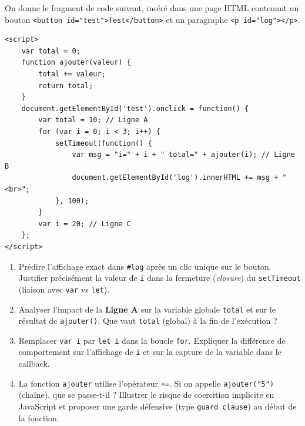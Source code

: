 \documentclass[11pt]{article}
\begin{document}
\begin{exercice}
On donne le fragment de code suivant, inséré dans une page HTML contenant un bouton \texttt{<button id="test">Test</button>} et un paragraphe \texttt{<p id="log"></p>}.

\begin{verbatim}
<script>
    var total = 0;
    function ajouter(valeur) {
        total += valeur;
        return total;
    }
    document.getElementById('test').onclick = function() {
        var total = 10; // Ligne A
        for (var i = 0; i < 3; i++) {
            setTimeout(function() {
                var msg = "i=" + i + " total=" + ajouter(i); // Ligne B
                document.getElementById('log').innerHTML += msg + "<br>";
            }, 100);
        }
        var i = 20; // Ligne C
    };
</script>
\end{verbatim}

\begin{enumerate}
    \item Prédire l'affichage exact dans \texttt{\#log} après un clic unique sur le bouton. Justifier précisément la valeur de \texttt{i} dans la fermeture (\textit{closure}) du \texttt{setTimeout} (liaison avec \texttt{var} vs \texttt{let}).
    \item Analyser l'impact de la \textbf{Ligne A} sur la variable globale \texttt{total} et sur le résultat de \texttt{ajouter()}. Que vaut \texttt{total} (global) à la fin de l'exécution ?
    \item Remplacer \texttt{var i} par \texttt{let i} dans la boucle \texttt{for}. Expliquer la différence de comportement sur l'affichage de \texttt{i} et sur la capture de la variable dans le callback.
    \item La fonction \texttt{ajouter} utilise l'opérateur \texttt{+=}. Si on appelle \texttt{ajouter("5")} (chaîne), que se passe-t-il ? Illustrer le risque de coercition implicite en JavaScript et proposer une garde défensive (type \texttt{guard clause}) au début de la fonction.
\end{enumerate}
\end{exercice}
\end{document}
